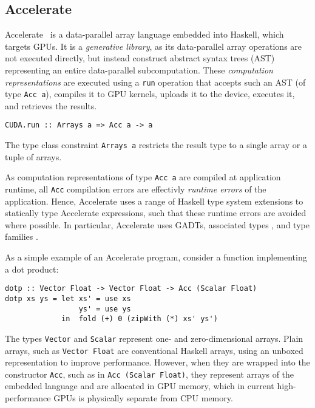 \documentclass{llncs}
\begin{document}
\subsection{Accelerate}
\label{sec:accelerate}

Accelerate~\cite{ChakravartyKellerLeeMcdonellGrover2011} is a data-parallel array language embedded into Haskell, which targets GPUs. It is a \emph{generative library}, as its data-parallel array operations are not executed directly, but instead construct abstract syntax trees (AST) representing an entire data-parallel subcomputation. These \emph{computation representations} are executed using a \verb+run+ operation that accepts such an AST (of type \verb+Acc a+), compiles it to GPU kernels, uploads it to the device, executes it, and retrieves the results.
%
\begin{verbatim}
CUDA.run :: Arrays a => Acc a -> a
\end{verbatim}
%
The type class constraint \verb+Arrays a+ restricts the result type to a single array or a tuple of arrays.

As computation representations of type \verb+Acc a+ are compiled at application runtime, all \verb+Acc+ compilation errors are effectivly \emph{runtime errors} of the application. Hence, Accelerate uses a range of Haskell type system extensions to statically type Accelerate expressions, such that these runtime errors are avoided where possible. In particular, Accelerate uses GADTs\cite{PeytonJonesVytiniotisWeirichWashburn2006}, associated types
\cite{ChakravartyKellerJones2005}, and type families
\cite{SchrijversPeytonJonesChakravartySulzmann2008}. 

As a simple example of an Accelerate program, consider a function implementing a dot product:
%
\begin{verbatim}
dotp :: Vector Float -> Vector Float -> Acc (Scalar Float)
dotp xs ys = let xs' = use xs
                 ys' = use ys
             in  fold (+) 0 (zipWith (*) xs' ys')
\end{verbatim}
%
The types \verb+Vector+ and \verb+Scalar+ represent one- and zero-dimensional
arrays. Plain arrays, such as \verb+Vector Float+ are conventional Haskell arrays, using an unboxed representation to improve performance. However, when they are wrapped into the constructor \verb+Acc+, such as in \verb+Acc (Scalar Float)+, they represent arrays of the embedded language and are allocated in GPU memory, which in current high-performance GPUs is physically separate from CPU memory.
\end{document}
